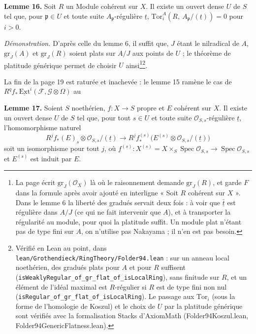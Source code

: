 \documentclass[11pt,a4paper]{article}
\begin{document}
\textbf{Lemme 16.} Soit $R$ un Module cohérent sur $X$. Il existe un ouvert
dense $U$ de $S$ tel que, pour $\mathfrak{p} \in U$ et toute suite
$A_{\mathfrak{p}}$-régulière $\underline{t}$,
$\mathrm{Tor}_i^{A}(R,\ A_{\mathfrak{p}}/(\underline{t})) = 0$ pour $i > 0$.

\emph{Démonstration.} D'après celle du lemme 6, il suffit que, $J$ étant le
nilradical de $A$, $\mathrm{gr}_J(A)$ et $\mathrm{gr}_J(R)$ soient plats sur
$A/J$ aux points de $U$ ; le théorème de platitude générique permet de choisir
$U$ ainsi\footnote{La page écrit $\mathrm{gr}_J(\mathcal{O}_X)$ là où le
raisonnement demande $\mathrm{gr}_J(R)$, et garde $F$ dans la formule après
avoir ajouté en interligne « Soit $R$ cohérent sur $X$ ». Dans le lemme 6 la
liberté des gradués servait deux fois : à voir que $\bar{\underline{t}}$ est
régulière dans $A/J$ (ce qui ne fait intervenir que $A$), et à transporter la
régularité au module, pour quoi la platitude suffit. Un module plat n'étant pas
de type fini sur $A$, on n'utilise pas Nakayama ; il n'en est pas besoin.}\footnote{Vérifié
en Lean au point, dans \texttt{lean/Grothendieck/RingTheory/Folder94.lean} : sur un anneau
local noethérien, des gradués plats pour $A$ et pour $R$ suffisent
(\texttt{isWeaklyRegular\_of\_gr\_flat\_of\_isLocalRing}), sans finitude sur
$R$, et un élément de l'idéal maximal est $R$-régulier si $R$ est de type fini
non nul (\texttt{isRegular\_of\_gr\_flat\_of\_isLocalRing}). Le passage aux
$\mathrm{Tor}_i$ (sous la forme de l'homologie de Koszul) et le choix de $U$
par la platitude générique sont vérifiés avec la formalisation Stacks
d'AxiomMath (Folder94Koszul.lean, Folder94GenericFlatness.lean).}.

La fin de la page 19 est raturée et inachevée : le lemme 15 ramène le cas de
$R^q f_{*}\,\underline{\mathrm{Ext}}^{i}(\mathcal{F}, \mathcal{G} \otimes
\Omega)$ au

\textbf{Lemme 17.} Soient $S$ noethérien, $f \colon X \to S$ propre et $E$
cohérent sur $X$. Il existe un ouvert dense $U$ de $S$ tel que, pour tout
$s \in U$ et toute suite $\mathcal{O}_{S,s}$-régulière $\underline{t}$,
l'homomorphisme naturel
\[
  R^{j} f_{*}(E)_s \otimes \mathcal{O}_{S,s}/(\underline{t}) \longrightarrow
  R^{j} f^{(s)}_{*}\bigl(E^{(s)} \otimes \mathcal{O}_{S,s}/(\underline{t})\bigr)
\]
soit un isomorphisme pour tout $j$, où $f^{(s)} \colon X^{(s)} = X \times_S
\operatorname{Spec} \mathcal{O}_{S,s} \to \operatorname{Spec}
\mathcal{O}_{S,s}$ et $E^{(s)}$ est induit par $E$.
\end{document}
